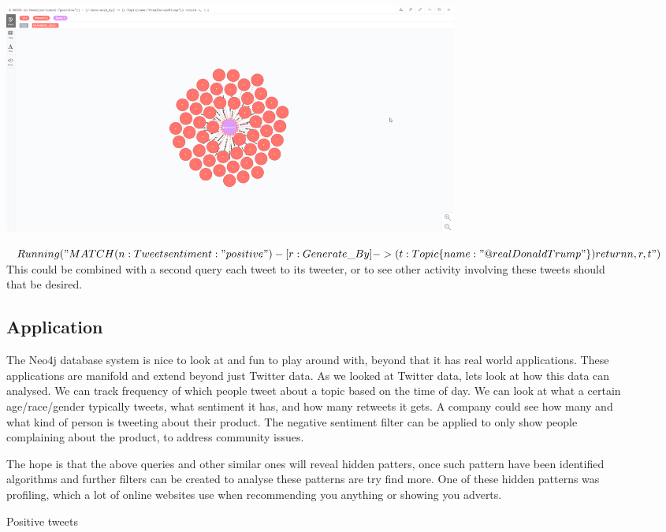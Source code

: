 \documentclass[11pt]{article}
\begin{document}
\begin{figure}
\includegraphics[width=15cm]{Positive}
\caption{Positive tweets} 
\label{fig: 6}

$Running ("MATCH (n:Tweet{sentiment:"positive"}) - [r:Generate\_By] -> (t:Topic\{name:"@realDonaldTrump"\}) return n,r,t")$
This could be combined with a second query each tweet to its tweeter, or to see other activity involving these tweets should that be desired.
\subsection{Application}
The Neo4j database system is nice to look at and fun to play around with, beyond that it has real world applications. These applications are manifold and extend beyond just Twitter data. As we looked at Twitter data, lets look at how this data can analysed. We can track frequency of which people tweet about a topic based on the time of day. We can look at what a certain age/race/gender typically tweets, what sentiment it has, and how many retweets it gets. A company could see how many and what kind of person is tweeting about their product. The negative sentiment filter can be applied to only show people complaining about the product, to address community issues.

The hope is that the above queries and other similar ones will reveal hidden patters, once such pattern have been identified algorithms and further filters can be created to analyse these patterns are try find more. One of these hidden patterns was profiling, which a lot of online websites use when recommending you anything or showing you adverts. 
\end{figure}
\end{document}
